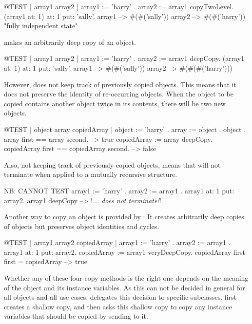 \documentclass[a4paper,10pt,twoside]{book}
\begin{document}
\begin{code}{@TEST | array1 array2 |}
array1 := { { 'harry' } } .
array2 := array1 copyTwoLevel.
(array1 at: 1) at: 1 put: 'sally'.
array1 --> #(#('sally'))
array2 --> #(#('harry'))    "fully independent state"
\end{code}

 makes an arbitrarily deep copy of an object.

\begin{code}{@TEST | array1 array2 |}
array1 := { { { 'harry' } } } .
array2 := array1 deepCopy.
(array1 at: 1) at: 1 put: 'sally'.
array1 --> #(#('sally'))
array2 --> #(#(#('harry')))
\end{code}

However,  does not keep track of previously copied objects. This means that it does not preserve the identity of re-occurring objects. When the object to be copied contains another object twice in its contents, there will be two new objects. 

\begin{code}{@TEST | object array copiedArray |}
object := { 'harry' }.
array := { object . object }.
array first == array second. --> true
copiedArray := array deepCopy.
copiedArray first == copiedArray second. --> false
\end{code}

Also, not keeping track of previously copied objects, means that  will not terminate when applied to a mutually recursive structure.

\begin{code}{NB: CANNOT TEST}
array1 := { 'harry' }.
array2 := { array1 }.
array1 at: 1 put: array2.
array1 deepCopy --> !\emph{... does not terminate!}!
\end{code}

Another way to copy an object is provided by : 
It creates arbitrarily deep copies of objects but preserves object identities and cycles. 

\begin{code}{@TEST | array1 array2 copiedArray |}
array1 := { 'harry' }.
array2 := { array1 }.
array1 at: 1 put: array2.
copiedArray := array1 veryDeepCopy.
copiedArray first first = copiedArray --> true
\end{code}

Whether any of these four copy methods is the right one depends on the meaning of the object and its instance variables. 
As this can not be decided in general for all objects and all use cases,  delegates this decision to specific subclasses. 
 first creates a shallow copy, and then asks this shallow copy to copy any instance variables that should be copied by sending  to it.
\end{document}
